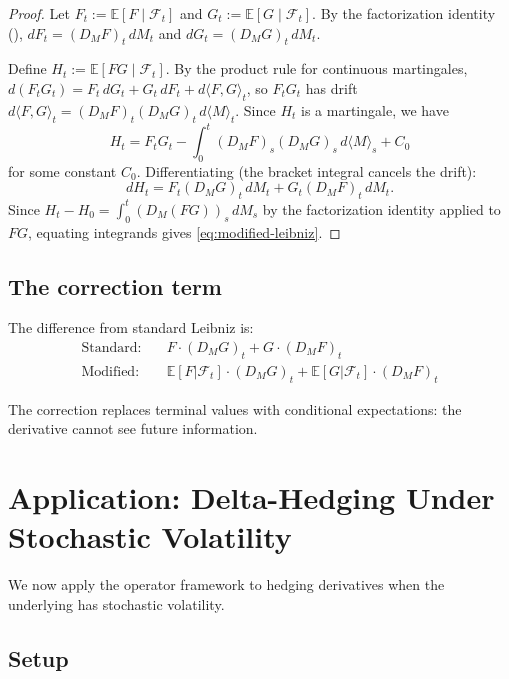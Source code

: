 \documentclass[11pt]{article}
\theoremstyle{plain}
\theoremstyle{definition}
\theoremstyle{remark}
\newcommand{\E}{\mathbb{E}}
\newcommand{\F}{\mathcal{F}}
\begin{document}
\begin{proof}
Let $F_t := \E[F \mid \F_t]$ and $G_t := \E[G \mid \F_t]$. By the factorization 
identity (), $dF_t = (D_M F)_t\,dM_t$ and 
$dG_t = (D_M G)_t\,dM_t$.

Define $H_t := \E[FG \mid \F_t]$. By the product rule for continuous martingales,
$d(F_t G_t) = F_t\,dG_t + G_t\,dF_t + d\langle F, G \rangle_t$, so $F_t G_t$ has 
drift $d\langle F, G \rangle_t = (D_M F)_t (D_M G)_t\,d\langle M \rangle_t$. 
Since $H_t$ is a martingale, we have
\[
H_t = F_t G_t - \int_0^t (D_M F)_s (D_M G)_s\,d\langle M \rangle_s + C_0
\]
for some constant $C_0$. Differentiating (the bracket integral cancels the drift):
\[
dH_t = F_t (D_M G)_t\,dM_t + G_t (D_M F)_t\,dM_t.
\]
Since $H_t - H_0 = \int_0^t (D_M(FG))_s\,dM_s$ by the factorization identity 
applied to $FG$, equating integrands gives \eqref{eq:modified-leibniz}.
\end{proof}

\subsection{The correction term}

The difference from standard Leibniz is:
\begin{align}
\text{Standard:} \quad & F \cdot (D_M G)_t + G \cdot (D_M F)_t \label{eq:standard}\\
\text{Modified:} \quad & \E[F|\F_t] \cdot (D_M G)_t + \E[G|\F_t] \cdot (D_M F)_t \label{eq:modified}
\end{align}

The correction replaces terminal values with conditional expectations: 
the derivative cannot see future information.

\section{Application: Delta-Hedging Under Stochastic Volatility}\label{sec:hedging}

We now apply the operator framework to hedging derivatives when the underlying 
has stochastic volatility.

\subsection{Setup}
\end{document}
